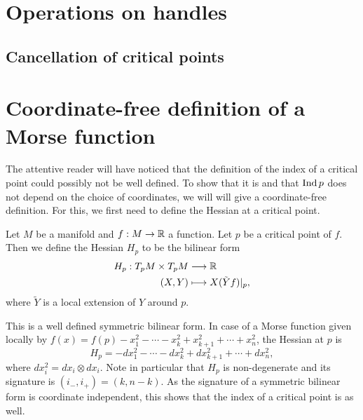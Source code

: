 \section{Operations on handles}
\subsection{Cancellation of critical points}

\section{Coordinate-free definition of a Morse function}


The attentive reader will have noticed that the definition of the index of a critical point could possibly not be well defined.
To show that it is and that $\operatorname{Ind} p$ does not depend on the choice of coordinates, we will will give a coordinate-free definition. For this, we first need to define the Hessian at a critical point.

\begin{definition}
    Let $M$ be a manifold and $f: M \to  \mathbb{R}$ a function.
    Let $p$ be a critical point of $f$.
    Then we define the Hessian $H_p$ to be the bilinear form
    \begin{align*}
        H_p: T_pM \times T_pM &\longrightarrow  \mathbb{R}\\
        (X, Y) &\longmapsto X (\tilde{Y} f)|_p
    ,\end{align*} 
    where $\tilde{Y}$ is a local extension of $Y$ around $p$.
\end{definition}
This is a well defined symmetric bilinear form.
In case of a Morse function given locally by $f(x) = f(p) - x_1^2 - \cdots - x_k^2 + x_{k+1}^2 + \cdots + x_n^2$, the Hessian at $p$ is 
\[
    H_p = - dx_1^2 - \cdots - dx_k^2 + dx_{k+1}^2  + \cdots + dx_n^2
,\] 
where $dx_i^2 = dx_i \otimes dx_i$.
Note in particular that $H_p$ is non-degenerate and its signature is $(i_-, i_{+}) = (k, n-k)$.
As the signature of a symmetric bilinear form is coordinate independent, this shows that the index of a critical point is as well.


